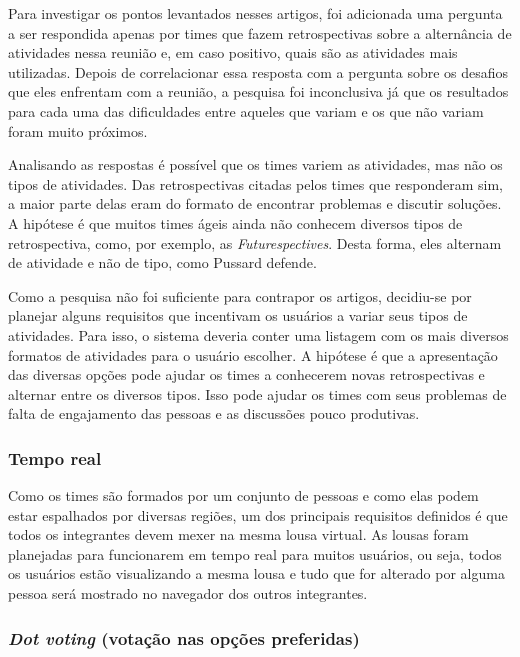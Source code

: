Para investigar os pontos levantados nesses artigos, foi adicionada uma pergunta a ser respondida apenas por times que fazem retrospectivas sobre a  alternância de atividades nessa reunião e, em caso positivo, quais são as atividades mais utilizadas. Depois de correlacionar essa resposta com a pergunta sobre os desafios que eles enfrentam com a reunião, a pesquisa foi inconclusiva já que os resultados para cada uma das dificuldades entre aqueles que variam e os que não variam foram muito próximos.

Analisando as respostas é possível que os times variem as atividades, mas não os tipos de atividades. Das retrospectivas citadas pelos times que responderam sim, a maior parte delas eram do formato de encontrar problemas e discutir soluções. A hipótese é que muitos times ágeis ainda não conhecem diversos tipos de retrospectiva, como, por exemplo, as \textit{Futurespectives}. Desta forma, eles alternam de atividade e não de tipo, como Pussard defende.

Como a pesquisa não foi suficiente para contrapor os artigos, decidiu-se por planejar alguns requisitos que incentivam os usuários a variar seus tipos de atividades. Para isso, o sistema deveria conter uma listagem com os mais diversos formatos de atividades para o usuário escolher. A hipótese é que a apresentação das diversas opções pode ajudar os times a conhecerem novas retrospectivas e alternar entre os diversos tipos. Isso pode ajudar os times com seus problemas de falta de engajamento das pessoas e as discussões pouco produtivas.

\subsubsection*{Tempo real}

Como os times são formados por um conjunto de pessoas e como elas podem estar espalhados por diversas regiões, um dos principais requisitos definidos é que todos os integrantes devem mexer na mesma lousa virtual. As lousas foram planejadas  para funcionarem em tempo real para muitos usuários, ou seja, todos os usuários estão visualizando a mesma lousa e tudo que for alterado por alguma pessoa será mostrado no navegador dos outros integrantes.

\subsubsection*{\textit{Dot voting} (votação nas opções preferidas)}

